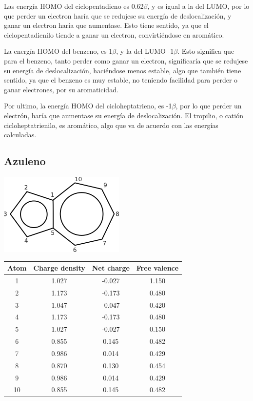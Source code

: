 \documentclass[12pt]{article}
\begin{document}
Las energía HOMO del ciclopentadieno es 0.62$\beta$, y es igual a la del LUMO, por lo que perder un electron haría que se redujese su energía de deslocalización, y ganar un electron haría que aumentase. Esto tiene sentido, ya que el ciclopentadienilo tiende a ganar un electron, convirtiéndose en aromático.

La energía HOMO del benzeno, es 1$\beta$, y la del LUMO -1$\beta$. Esto significa que para el benzeno, tanto perder como ganar un electron, significaría que se redujese su energía de deslocalización, haciéndose menos estable, algo que también tiene sentido, ya que el benzeno es muy estable, no teniendo facilidad para perder o ganar electrones, por su aromaticidad.

Por ultimo, la energía HOMO del cicloheptatrieno, es -1$\beta$, por lo que perder un electrón, haría que aumentase su energía de deslocalización. El tropilio, o catión cicloheptatrienilo, es aromático, algo que va de acuerdo con las energías calculadas.





\subsection{Azuleno}
\begin{center}
    \includegraphics[height=0.25\textwidth]{azulene.png}
\end{center}

\begin{center}
\begin{tabular}{|c|c|c|c|}
\hline
     Atom     & Charge density & Net charge   & Free valence \\
\hline
      1       & 1.027          & -0.027       & 1.150 \\
      2       & 1.173          & -0.173       & 0.480 \\
      3       & 1.047          & -0.047       & 0.420 \\
      4       & 1.173          & -0.173       & 0.480 \\
      5       & 1.027          & -0.027       & 0.150 \\
      6       & 0.855          &  0.145       & 0.482 \\
      7       & 0.986          &  0.014       & 0.429 \\
      8       & 0.870          &  0.130       & 0.454 \\
      9       & 0.986          &  0.014       & 0.429 \\
     10       & 0.855          &  0.145       & 0.482 \\
\hline
\end{tabular}
\end{center}
\end{document}
